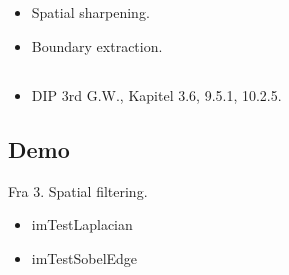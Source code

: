 \subsection{\subtopics}

\begin{itemize}
	\item Spatial sharpening.
	\item Boundary extraction.
\end{itemize}

\subsection{\curriculum}

\begin{itemize}
	\item DIP 3rd G.W., Kapitel 3.6, 9.5.1, 10.2.5.
\end{itemize}

\subsection{Demo}

Fra 3. Spatial filtering.

\begin{itemize}
	\item imTestLaplacian
	\item imTestSobelEdge
\end{itemize}
